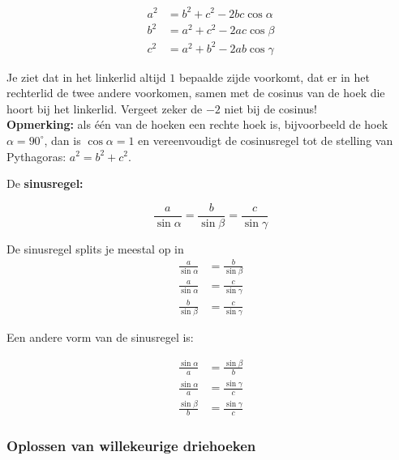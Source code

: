 

\begin{align*}
a^2&= b^2+c^2-2bc\cos \alpha\\
b^2&=a^2 + c^2 - 2ac\cos \beta\\
c^2&= a^2 + b^2 -2ab \cos \gamma
\end{align*}

Je ziet dat in het linkerlid altijd $1$ bepaalde zijde voorkomt, dat er in het rechterlid de twee andere voorkomen, samen met de cosinus van de hoek die hoort bij het linkerlid. Vergeet zeker de $-2$ niet bij de cosinus!\\

{\bf Opmerking:} als \'{e}\'{e}n van de hoeken een rechte hoek is, bijvoorbeeld de hoek $\alpha=90^\circ$, dan is $\cos \alpha =1$ en vereenvoudigt de cosinusregel tot de stelling van Pythagoras: $a^2=b^2 +c^2$.

De \textbf{sinusregel:}

\[\frac{a}{\sin \alpha}=\frac{b}{\sin \beta}=\frac{c}{\sin \gamma}\]

De sinusregel splits je meestal op in
\begin{align*}
\frac{a}{\sin \alpha} &= \frac{b}{\sin \beta}\\
\frac{a}{\sin \alpha} &= \frac{c}{\sin \gamma}\\
\frac{b}{\sin \beta} &= \frac{c}{\sin \gamma}
\end{align*}

Een andere vorm van de sinusregel is:

\begin{align*}
\frac{\sin \alpha}{a} &= \frac{\sin \beta}{b}\\
\frac{\sin \alpha}{a} &= \frac{\sin \gamma}{c}\\
\frac{\sin \beta}{b} &= \frac{\sin \gamma}{c}
\end{align*}

\subsubsection{Oplossen van willekeurige driehoeken}

